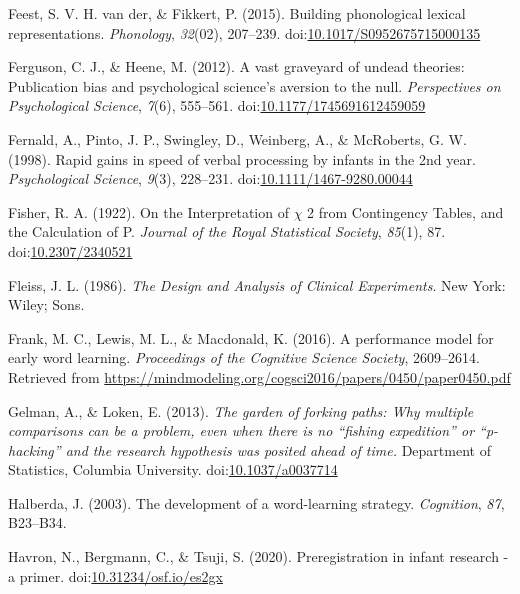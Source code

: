 \documentclass[
  man, noextraspace]{apa6}
\begin{document}
\leavevmode\hypertarget{ref-vanderFeest2015}{}%
Feest, S. V. H. van der, \& Fikkert, P. (2015). Building phonological lexical representations. \emph{Phonology}, \emph{32}(02), 207--239. doi:\href{https://doi.org/10.1017/S0952675715000135}{10.1017/S0952675715000135}

\leavevmode\hypertarget{ref-Ferguson2012}{}%
Ferguson, C. J., \& Heene, M. (2012). A vast graveyard of undead theories: Publication bias and psychological science's aversion to the null. \emph{Perspectives on Psychological Science}, \emph{7}(6), 555--561. doi:\href{https://doi.org/10.1177/1745691612459059}{10.1177/1745691612459059}

\leavevmode\hypertarget{ref-Fernald1998}{}%
Fernald, A., Pinto, J. P., Swingley, D., Weinberg, A., \& McRoberts, G. W. (1998). Rapid gains in speed of verbal processing by infants in the 2nd year. \emph{Psychological Science}, \emph{9}(3), 228--231. doi:\href{https://doi.org/10.1111/1467-9280.00044}{10.1111/1467-9280.00044}

\leavevmode\hypertarget{ref-Fisher1922}{}%
Fisher, R. A. (1922). On the Interpretation of \(\chi\) 2 from Contingency Tables, and the Calculation of P. \emph{Journal of the Royal Statistical Society}, \emph{85}(1), 87. doi:\href{https://doi.org/10.2307/2340521}{10.2307/2340521}

\leavevmode\hypertarget{ref-Fleiss1986}{}%
Fleiss, J. L. (1986). \emph{The Design and Analysis of Clinical Experiments}. New York: Wiley; Sons.

\leavevmode\hypertarget{ref-Frank2016}{}%
Frank, M. C., Lewis, M. L., \& Macdonald, K. (2016). A performance model for early word learning. \emph{Proceedings of the Cognitive Science Society}, 2609--2614. Retrieved from \url{https://mindmodeling.org/cogsci2016/papers/0450/paper0450.pdf}

\leavevmode\hypertarget{ref-Gelman2013}{}%
Gelman, A., \& Loken, E. (2013). \emph{The garden of forking paths: Why multiple comparisons can be a problem, even when there is no ``fishing expedition'' or ``p-hacking'' and the research hypothesis was posited ahead of time.} Department of Statistics, Columbia University. doi:\href{https://doi.org/10.1037/a0037714}{10.1037/a0037714}

\leavevmode\hypertarget{ref-Halberda2003}{}%
Halberda, J. (2003). The development of a word-learning strategy. \emph{Cognition}, \emph{87}, B23--B34.

\leavevmode\hypertarget{ref-Havron}{}%
Havron, N., Bergmann, C., \& Tsuji, S. (2020). Preregistration in infant research - a primer. doi:\href{https://doi.org/10.31234/osf.io/es2gx}{10.31234/osf.io/es2gx}
\end{document}
